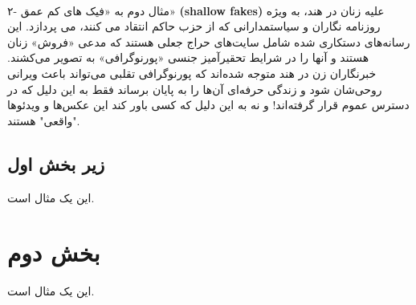 \documentclass[12pt,oneside]{book}
\begin{document}
    \paragraph{}
    ۲- مثال دوم به «فیک های کم عمق» \textenglish{\textbf{(shallow fakes)}} علیه زنان در هند، به ویژه روزنامه نگاران و سیاستمدارانی که از حزب حاکم انتقاد می کنند، می پردازد.
    این رسانه‌های دستکاری شده شامل سایت‌های حراج جعلی هستند که مدعی «فروش» زنان هستند و آنها را در شرایط تحقیرآمیز جنسی «پورنوگرافی» به تصویر می‌کشند.
    خبرنگاران زن در هند متوجه شده‌اند که پورنوگرافی تقلبی می‌تواند باعث ویرانی روحی‌شان شود و زندگی حرفه‌ای آن‌ها را به پایان برساند فقط به این دلیل که در دسترس عموم قرار گرفته‌اند!
    و نه به این دلیل که کسی باور کند این عکس‌ها و ویدئوها "واقعی" هستند.



    \subsection{زیر بخش اول}

    این یک مثال است.


    \section{بخش دوم}

    این یک مثال است.

    \backmatter
\end{document}
